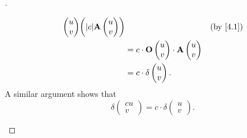 \begin{proof}[]
\begin{enumerate}
\begin{align*}
{\begin{pmatrix}
                                                                           u \\
                                                                           v
                                                                         \end{pmatrix}} \pa{\abs{c} \mathbf{A}\begin{pmatrix}
                                                                                                                u \\
                                                                                                                v
                                                                                                              \end{pmatrix}} &  & \by{4.1} \\
                                  & = c \cdot \mathbf{O}\begin{pmatrix}
                                                          u \\
                                                          v
                                                        \end{pmatrix} \cdot \mathbf{A}\begin{pmatrix}
                                                                                        u \\
                                                                                        v
                                                                                      \end{pmatrix}                                     \\
                                  & = c \cdot \delta\begin{pmatrix}
                                                      u \\
                                                      v
                                                    \end{pmatrix}.
          \end{align*}
          A similar argument shows that
          \[
            \delta\begin{pmatrix}
              cu \\
              v
            \end{pmatrix} = c \cdot \delta\begin{pmatrix}
              u \\
              v
            \end{pmatrix}.
          \]


\end{enumerate}
\end{proof}
